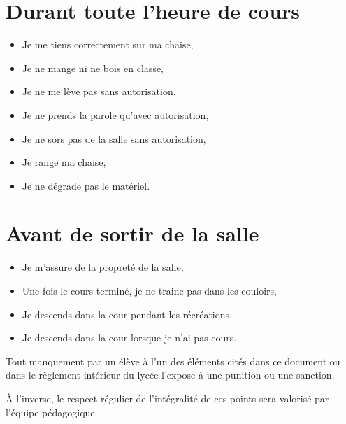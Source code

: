 \documentclass[11pt]{article}
\begin{document}
\section{Durant toute l'heure de cours}

\begin{itemize}
  \item Je me tiens correctement sur ma chaise,
  \item Je ne mange ni ne bois en classe,
  \item Je ne me lève pas sans autorisation,
  \item Je ne prends la parole qu'avec autorisation,
  \item Je ne sors pas de la salle sans autorisation,
  \item Je range ma chaise,
  \item Je ne dégrade pas le matériel.
\end{itemize}


\section{Avant de sortir de la salle}
\begin{itemize}
  \item Je m'assure de la propreté de la salle,
  \item Une fois le cours terminé, je ne traine pas dans les couloirs,
  \item Je descends dans la cour pendant les récréations,
  \item Je descends dans la cour lorsque je n'ai pas cours.
\end{itemize}
Tout manquement par un élève à l'un des éléments cités dans ce document ou dans le règlement intérieur du lycée l'expose à une punition ou une sanction.

À l'inverse, le respect régulier de l'intégralité de ces points sera valorisé par l'équipe pédagogique.
\end{document}
